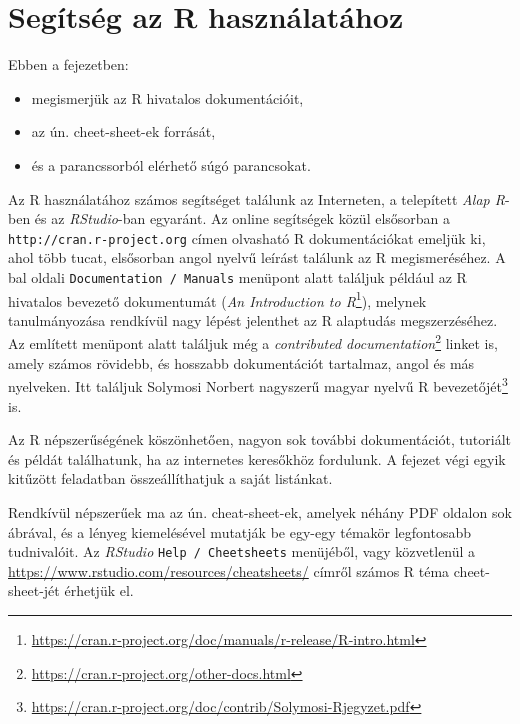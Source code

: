\documentclass[
]{book}
\makeatletter
\DeclareRobustCommand{\href}[2]{#2\footnote{\url{#1}}}
\providecommand{\tightlist}{%
  \setlength{\itemsep}{0pt}\setlength{\parskip}{0pt}}
\renewcommand{\href}[2]{#2\footnote{\url{#1}}}
\newenvironment{kframe}{%
\medskip{}
\setlength{\fboxsep}{.8em}
 \def\at@end@of@kframe{}%
 \ifinner\ifhmode%
  \def\at@end@of@kframe{\end{minipage}}%
  \begin{minipage}{\columnwidth}%
 \fi\fi%
 \def\FrameCommand##1{\hskip\@totalleftmargin \hskip-\fboxsep
 \colorbox{shadecolor}{##1}\hskip-\fboxsep
     \hskip-\linewidth \hskip-\@totalleftmargin \hskip\columnwidth}%
 \MakeFramed {\advance\hsize-\width
   \@totalleftmargin\z@ \linewidth\hsize
   \@setminipage}}%
 {\par\unskip\endMakeFramed%
 \at@end@of@kframe}
\newenvironment{rmdblock}[1]
  {
  \begin{itemize}
  \renewcommand{\labelitemi}{
    \raisebox{-.7\height}[0pt][0pt]{
      {\setkeys{Gin}{width=3em,keepaspectratio}\texttt{[image: images/\#1]}}
    }
  }
  \setlength{\fboxsep}{1em}
  \begin{kframe}
  \item
  }
  {
  \end{kframe}
  \end{itemize}
  }
\newenvironment{rmdlevel2}
  {\begin{rmdblock}{level2}}
  {\end{rmdblock}}
\makeatother
\begin{document}
\hypertarget{seguxedtsuxe9g-az-r-hasznuxe1latuxe1hoz}{%
\section{Segítség az R használatához}\label{seguxedtsuxe9g-az-r-hasznuxe1latuxe1hoz}}

\begin{rmdlevel2}
Ebben a fejezetben:

\begin{itemize}
\tightlist
\item
  megismerjük az R hivatalos dokumentációit,
\item
  az ún. cheet-sheet-ek forrását,
\item
  és a parancssorból elérhető súgó parancsokat.
\end{itemize}
\end{rmdlevel2}

Az R használatához számos segítséget találunk az Interneten, a telepített \emph{Alap R}-ben és az \emph{RStudio}-ban egyaránt. Az online segítségek közül elsősorban a \texttt{http://cran.r-project.org} címen olvasható R dokumentációkat emeljük ki, ahol több tucat, elsősorban angol nyelvű leírást találunk az R megismeréséhez. A bal oldali \texttt{Documentation\ /\ Manuals} menüpont alatt találjuk például az R hivatalos bevezető dokumentumát (\href{https://cran.r-project.org/doc/manuals/r-release/R-intro.html}{\emph{An Introduction to R}}), melynek tanulmányozása rendkívül nagy lépést jelenthet az R alaptudás megszerzéséhez. Az említett menüpont alatt találjuk még a \href{https://cran.r-project.org/other-docs.html}{\emph{contributed documentation}} linket is, amely számos rövidebb, és hosszabb dokumentációt tartalmaz, angol és más nyelveken. Itt találjuk Solymosi Norbert nagyszerű magyar nyelvű \href{https://cran.r-project.org/doc/contrib/Solymosi-Rjegyzet.pdf}{R bevezetőjét} is.

Az R népszerűségének köszönhetően, nagyon sok további dokumentációt, tutoriált és példát találhatunk, ha az internetes keresőkhöz fordulunk. A fejezet végi egyik kitűzött feladatban összeállíthatjuk a saját listánkat.

Rendkívül népszerűek ma az ún. cheat-sheet-ek, amelyek néhány PDF oldalon sok ábrával, és a lényeg kiemelésével mutatják be egy-egy témakör legfontosabb tudnivalóit. Az \emph{RStudio} \texttt{Help\ /\ Cheetsheets} menüjéből, vagy közvetlenül a \url{https://www.rstudio.com/resources/cheatsheets/} címről számos R téma cheet-sheet-jét érhetjük el.
\end{document}
